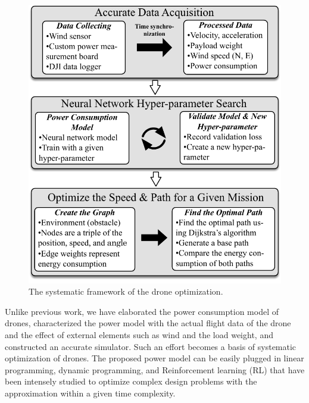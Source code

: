 \documentclass[journal]{./template/IEEEtran}
\begin{document}
\begin{figure}[ht]
\centering\includegraphics[scale=0.6]{fig16/system-framework.pdf}
\caption{The systematic framework of the drone optimization.}
\label{fig:freamwork}
\end{figure}

Unlike previous work, we have elaborated the power consumption model of drones, characterized the power model with the actual flight data of the drone and the effect of external elements such as wind and the load weight, and constructed an accurate simulator.
Such an effort becomes a basis of systematic optimization of drones.
The proposed power model can be easily plugged in linear programming, dynamic programming, and Reinforcement learning (RL) that have been intensely studied to optimize complex design problems with the approximation within a given time complexity.
\end{document}
